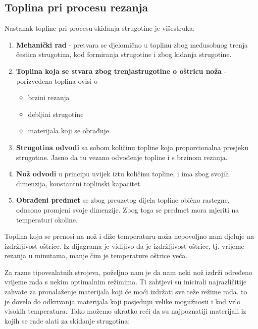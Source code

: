\documentclass[a4paper,12pt]{article}
\numberwithin{figure}{section}
\begin{document}
\subsection{Toplina pri procesu rezanja}
Nastanak topline pri procesu skidanja strugotine je višestruka:
\begin{enumerate}
\item \textbf{Mehanički rad} - pretvara se djelomično u toplinu zbog međusobnog trenja čestica strugotina, kod formiranja strugotine i zbog kidanja strugotine.
\item \textbf{Toplina koja se stvara zbog trenjastrugotine o oštricu noža} - porizvedena toplina ovisi o 
\begin{itemize}
\item brzini rezanja
\item debljini strugotine
\item materijala koji se obrađuje
\end{itemize}
\item \textbf{Strugotina odvodi} sa sobom količinu topline koja proporcionalna presjeku strugotine. Jasno da tu vezano odvođenje topline i s brzinom rezanja.
\item \textbf{Nož odvodi} u principu uvijek iztu količinu topline, i ima zbog svojih dimenzija, konstantni toplinski kapacitet.
\item \textbf{Obrađeni predmet} se zbog preuzetog dijela topline obično rastegne, odnsono promjeni svoje dimenzije. Zbog toga se predmet mora mjeriti na temperaturi okoline.
\end{enumerate}
Toplina koja se prenosi na nož i diže temperaturu noža nepovoljno nam djeluje na izdržljivost oštrice.
Iz dijagrama je vidljivo da je izdržljivost oštrice, tj. vrijeme rezanja u minutama, manje čim je temperature oštrice veća.\par 
Za razne tipovealatnih strojeva, poželjno nam je da nam neki nož izdrži određeno vrijeme rada s nekim optimalnim režimima. Ti zahtjevi su inicirali najrazličitije zahvate za pronalaženje materijala koji će moći izdržati sve teže režime rada. to je dovelo do odkrivanja materijala koji posjeduju velike mogužnosti i kod vrlo visokih temperatura. Tako možemo ukratko reći da su najpoznatiji materijali iz kojih se rade alati za skidanje strugotina:
\end{document}
